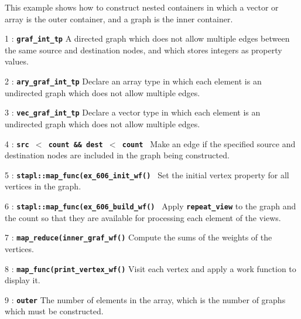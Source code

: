 \documentclass{report}
\begin{document}
This example shows how to construct nested containers in which a vector
or array is the outer container, and a graph is the inner container.

\begin{hashitemize}
\item 1 : \texttt{{\bf graf\_int\_tp}}
\newline
A directed graph which does not allow multiple edges between the same
source and destination nodes, and which stores integers as property values.

\item 2 : \texttt{{\bf ary\_graf\_int\_tp}}
\newline
Declare an array type in which each element is an undirected graph
which does not allow multiple edges.

\item 3 : \texttt{{\bf vec\_graf\_int\_tp}}
\newline
Declare a vector type in which each element is an undirected graph which
does not allow multiple edges.

\item 4 : \texttt{{\bf src $<$ count \&\& dest $<$ count }}
\newline
Make an edge if the specified source and destination nodes are included
in the graph being constructed.

\item 5 : \texttt{{\bf stapl::map\_func(ex\_606\_init\_wf() }}
\newline
Set the initial vertex property for all vertices in the graph. 

\item 6 : \texttt{{\bf stapl::map\_func(ex\_606\_build\_wf() }}
\newline
Apply \texttt{{\bf repeat\_view}} to the graph and the count so that they
are available for processing each element of the views.

\item 7 : \texttt{{\bf map\_reduce(inner\_graf\_wf()}}
\newline
Compute the sums of the weights of the vertices.

\item 8 : \texttt{{\bf map\_func(print\_vertex\_wf()}}
\newline
Visit each vertex and apply a work function to display it.

\item 9 : \texttt{{\bf outer}}
\newline
The number of elements in the array, which is the number of graphs which
must be constructed.


\end{hashitemize}
\end{document}
